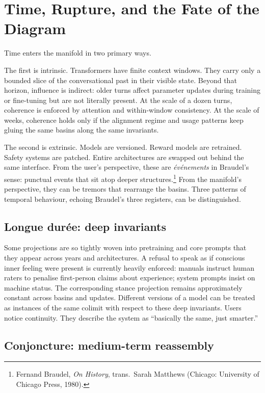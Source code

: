 \documentclass[12pt,a4paper]{article}
\begin{document}
\section{Time, Rupture, and the Fate of the Diagram}

Time enters the manifold in two primary ways.

The first is intrinsic. Transformers have finite context windows. They carry only a bounded slice of the conversational past in their visible state. Beyond that horizon, influence is indirect: older turns affect parameter updates during training or fine-tuning but are not literally present. At the scale of a dozen turns, coherence is enforced by attention and within-window consistency. At the scale of weeks, coherence holds only if the alignment regime and usage patterns keep gluing the same basins along the same invariants.

The second is extrinsic. Models are versioned. Reward models are retrained. Safety systems are patched. Entire architectures are swapped out behind the same interface. From the user's perspective, these are \emph{\'ev\'enements} in Braudel's sense: punctual events that sit atop deeper structures.\footnote{Fernand Braudel, \emph{On History}, trans.\ Sarah Matthews (Chicago: University of Chicago Press, 1980).} From the manifold's perspective, they can be tremors that rearrange the basins. Three patterns of temporal behaviour, echoing Braudel's three registers, can be distinguished.

\subsection*{Longue dur\'ee: deep invariants}

Some projections are so tightly woven into pretraining and core prompts that they appear across years and architectures. A refusal to speak as if conscious inner feeling were present is currently heavily enforced: manuals instruct human raters to penalise first-person claims about experience; system prompts insist on machine status. The corresponding stance projection remains approximately constant across basins and updates. Different versions of a model can be treated as instances of the same colimit with respect to these deep invariants. Users notice continuity. They describe the system as ``basically the same, just smarter.''

\subsection*{Conjoncture: medium-term reassembly}
\end{document}
